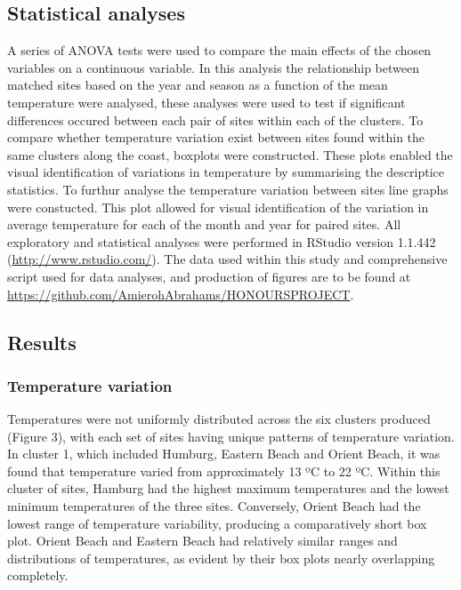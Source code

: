 \documentclass[12pt,]{article}
\begin{document}
\subsection{Statistical analyses}\label{statistical-analyses}

A series of ANOVA tests were used to compare the main effects of the
chosen variables on a continuous variable. In this analysis the
relationship between matched sites based on the year and season as a
function of the mean temperature were analysed, these analyses were used
to test if significant differences occured between each pair of sites
within each of the clusters. To compare whether temperature variation
exist between sites found within the same clusters along the coast,
boxplots were constructed. These plots enabled the visual identification
of variations in temperature by summarising the descriptice statistics.
To furthur analyse the temperature variation between sites line graphs
were constucted. This plot allowed for visual identification of the
variation in average temperature for each of the month and year for
paired sites. All exploratory and statistical analyses were performed in
RStudio version 1.1.442 (\url{http://www.rstudio.com/}). The data used
within this study and comprehensive script used for data analyses, and
production of figures are to be found at
\url{https://github.com/AmierohAbrahams/HONOURSPROJECT}.

\subsection{Results}\label{results}

\subsubsection{Temperature variation}\label{temperature-variation}

Temperatures were not uniformly distributed across the six clusters
produced (Figure 3), with each set of sites having unique patterns of
temperature variation. In cluster 1, which included Humburg, Eastern
Beach and Orient Beach, it was found that temperature varied from
approximately 13 ºC to 22 ºC. Within this cluster of sites, Hamburg had
the highest maximum temperatures and the lowest minimum temperatures of
the three sites. Conversely, Orient Beach had the lowest range of
temperature variability, producing a comparatively short box plot.
Orient Beach and Eastern Beach had relatively similar ranges and
distributions of temperatures, as evident by their box plots nearly
overlapping completely.
\end{document}
